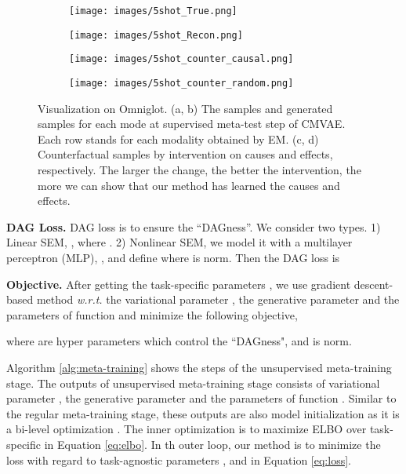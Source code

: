 \documentclass[letterpaper]{article} \usepackage{aaai23}  \usepackage{times}  \usepackage{helvet}  \usepackage{courier}  \usepackage[hyphens]{url}  \usepackage{graphicx} \urlstyle{rm} \def\UrlFont{\rm}  \usepackage{natbib}  \usepackage{caption} \frenchspacing  \setlength{\pdfpagewidth}{8.5in}  \setlength{\pdfpageheight}{11in}  \usepackage{algorithm}
\theoremstyle{plain}
\theoremstyle{definition}
\theoremstyle{remark}
\begin{document}
\begin{figure}
	\centering
	\begin{subfigure}[t]{.11\textwidth}
		\centering
		\texttt{[image: images/5shot\_True.png]}
		\caption{}
		\label{fig:res_a}
	\end{subfigure}
	\hfill
	\begin{subfigure}[t]{.11\textwidth}
		\centering
		\texttt{[image: images/5shot\_Recon.png]}
		\caption{}
		\label{fig:res_b}
	\end{subfigure}		
\hfill		
	\begin{subfigure}[t]{.11\textwidth}
		\centering
		\texttt{[image: images/5shot\_counter\_causal.png]}
		\caption{}
		\label{fig:res_c}
	\end{subfigure}
	\hfill
	\begin{subfigure}[t]{.11\textwidth}
		\centering
		\texttt{[image: images/5shot\_counter\_random.png]}
		\caption{ }
		\label{fig:res_d}
	\end{subfigure}
\caption{Visualization on Omniglot. (a, b) The samples and generated samples for each mode at supervised meta-test step of CMVAE. Each row stands for each modality obtained by EM. (c, d) Counterfactual samples by intervention on {causes} and {effects}, respectively. The larger the change, the better the intervention, the more we can show that our method has learned the causes and effects.}  
\end{figure}


\textbf{DAG Loss.} DAG loss is to ensure the ``DAGness''. We consider two types. 1) Linear SEM, , where . 2) Nonlinear SEM, we model it with a multilayer perceptron (MLP), , and define  where   is  norm. Then the DAG loss \cite{Zheng2018dags} is 	
 

\noindent\textbf{Objective.} After getting the task-specific parameters , we use gradient descent-based method \textit{w.r.t.} the variational parameter , the generative parameter  and the parameters of function  and minimize the following objective,

where  are hyper parameters which control the ``DAGness", and  is  norm. 

Algorithm \ref{alg:meta-training} shows the steps of the unsupervised meta-training stage. The outputs of unsupervised meta-training stage consists of variational
parameter , the generative parameter  and the parameters of function . Similar to the regular meta-training stage, these outputs are also model initialization as it is a bi-level optimization \cite{9638340, pmlr-v162-vicol22a}.  The inner optimization is to maximize ELBO over task-specific  in Equation \ref{eq:elbo}. In th outer loop, our method is to minimize the loss with regard to  task-agnostic parameters ,  and  in Equation \ref{eq:loss}. 
\end{document}

